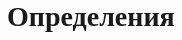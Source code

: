 \documentclass[a4paper,12pt]{article}
\begin{document}
\newpage

\section{Определения}
\end{document}

